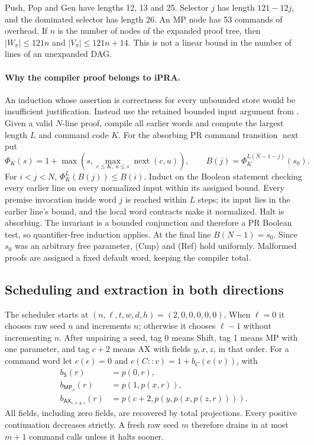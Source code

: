 Push, Pop and Gen have lengths 12, 13 and 25.  Selector $j$ has length
$121-12j$, and the dominated selector has length 26.  An MP node has
53 commands of overhead.  If $n$ is the number of nodes of the expanded
proof tree, then $|W_\pi|\le121n$ and $|V_\pi|\le121n+14$.
This is not a linear bound in the number of lines of an unexpanded DAG.

\paragraph{Why the compiler proof belongs to iPRA.}
An induction whose assertion is correctness for every unbounded store
would be insufficient justification.  Instead use the retained bounded
input argument from \cite{ax11h,gh}.  Given a valid $N$-line proof, compile
all earlier words and compute the largest length $L$ and command code $K$.
For the absorbing PR command transition $\operatorname{next}$ put
\[
 \Phi_K(s)=1+\max\left(s,\max_{c\le K,\ u\le s}
                                  \operatorname{next}(c,u)\right),
 \qquad B(j)=\Phi_K^{L(N-1-j)}(s_0).
\]
For $i<j<N$, $\Phi_K^L(B(j))\le B(i)$.  Induct on the Boolean statement
checking every earlier line on every normalized input within its assigned
bound.  Every premise invocation inside word $j$ is reached within $L$
steps; its input lies in the earlier line's bound, and the local word
contracts make it normalized.  Halt is absorbing.  The invariant is a
bounded conjunction and therefore a PR Boolean test, so quantifier-free
induction applies.  At the final line $B(N-1)=s_0$.  Since $s_0$ was an
arbitrary free parameter, (Cmp) and (Ref) hold uniformly.  Malformed
proofs are assigned a fixed default word, keeping the compiler total.

\subsection{Scheduling and extraction in both directions}

The scheduler starts at $(n,\ell,t,w,d,h)=(2,0,0,0,0,0)$.
When $\ell=0$ it chooses raw seed $n$ and increments $n$; otherwise it
chooses $\ell-1$ without incrementing $n$.  After unpairing a seed, tag
0 means Shift, tag 1 means MP with one parameter, and tag $c+2$ means
AX with fields $y,x,z$, in that order.  For a command word let
$e(\epsilon)=0$ and $e(C::v)=1+b_C(e(v))$, with
\[
\begin{split}
 b_{\mathsf S}(r)&=p(0,r),\\
 b_{\mathsf{MP}_x}(r)&=p(1,p(x,r)),\\
 b_{\mathsf{AX}_{c,x,y,z}}(r)&=p(c+2,p(y,p(x,p(z,r)))).
\end{split}
\]
All fields, including zero fields, are recovered by total projections.
Every positive continuation decreases strictly.  A fresh raw seed $m$
therefore drains in at most $m+1$ command calls unless it halts sooner.

